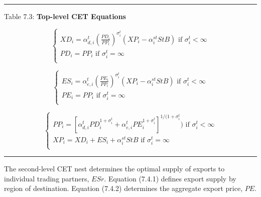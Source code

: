 \documentclass[12pt]{article}
\begin{document}
\noindent\rule{\linewidth}{0.4pt}
\begin{center}
\begin{large}
{\centering Table 7.3: \textbf{Top-level CET Equations} \par}

\begin{equation}
    \begin{cases}
      XD_i = \alpha^t_{d, i} \left(\frac{PD_i}{PP_i} \right)^{\sigma^t_i} \left(XP_i - \alpha^{st}_i StB \right) \text{ if } \sigma^t_i < \infty\\
      PD_i = PP_i \text{ if } \sigma^t_i = \infty\\
    \end{cases}
    \tag{7.3.1}
\end{equation}

\begin{equation}
    \begin{cases}
      ES_i = \alpha^t_{e, i} \left(\frac{PE_i}{PP_i} \right)^{\sigma^t_i} \left(XP_i - \alpha^{st}_i StB \right) \text{ if } \sigma^t_i < \infty\\
      PE_i = PP_i \text{ if } \sigma^t_i = \infty\\
    \end{cases}
    \tag{7.3.2}
\end{equation}

\begin{equation}
    \begin{cases}
      PP_i = \left[\alpha^t_{d, i} PD^{1 + \sigma^t_i}_i + \alpha^t_{e, i} PE^{1 + \sigma^t_i}_i \right]^{1/(1+ \sigma^t_i}) \text{ if } \sigma^t_i < \infty\\
      XP_i = XD_i +ES_i + \alpha^{st}_i StB \text{ if } \sigma^t_i = \infty\\
    \end{cases}
    \tag{7.3.3}
\end{equation}

\end{large}
\end{center}
\noindent\rule{\linewidth}{0.4pt}

The second-level CET nest determines the optimal supply of exports to individual trading partners, $ESr$. Equation (7.4.1) defines export supply by region of destination. Equation (7.4.2) determines the aggregate export price, $PE$.
\end{document}
